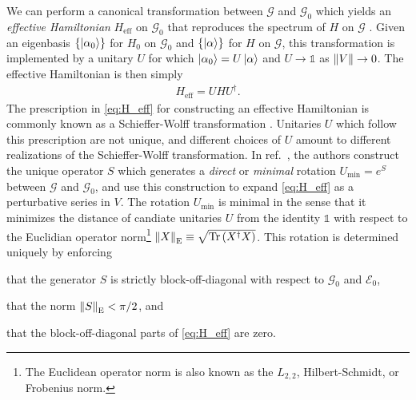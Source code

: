 \documentclass[preprint,showkeys,nofootinbib]{revtex4-1}
\renewcommand{\t}{\text} %
\newcommand{\p}[1]{\left(#1\right)} %
\renewcommand{\set}[1]{\left\{#1\right\}} %
\newcommand{\E}{\mathcal{E}}
\newcommand{\G}{\mathcal{G}}
\newcommand{\1}{\mathds{1}}
\begin{document}
We can perform a canonical transformation between $\G$ and $\G_0$
which yields an {\it effective Hamiltonian} $H_{\t{eff}}$ on $\G_0$
that reproduces the spectrum of $H$ on $\G$
\cite{bravyi2011schrieffer}.  Given an eigenbasis
$\set{\ket{\alpha_0}}$ for $H_0$ on $\G_0$ and $\set{\ket\alpha}$ for
$H$ on $\G$, this transformation is implemented by a unitary $U$ for
which $\ket{\alpha_0}=U\ket\alpha$ and $U\to\1$ as $\norm{V}\to0$.
The effective Hamiltonian is then simply
\begin{align}
  H_{\t{eff}} = U H U^\dag.
  \label{eq:H_eff}
\end{align}
The prescription in \eqref{eq:H_eff} for constructing an effective
Hamiltonian is commonly known as a Schieffer-Wolff transformation
\cite{schrieffer1966relation}.  Unitaries $U$ which follow this
prescription are not unique, and different choices of $U$ amount to
different realizations of the Schieffer-Wolff transformation.  In
ref.~\cite{bravyi2011schrieffer}, the authors construct the unique
operator $S$ which generates a {\it direct} or {\it minimal} rotation
$U_{\t{min}}=e^S$ between $\G$ and $\G_0$, and use this construction
to expand \eqref{eq:H_eff} as a perturbative series in $V$.  The
rotation $U_{\t{min}}$ is minimal in the sense that it minimizes the
distance of candiate unitaries $U$ from the identity $\1$ with respect
to the Euclidian operator norm\footnote{The Euclidean operator norm is
  also known as the $L_{2,2}$, Hilbert-Schmidt, or Frobenius norm.}
$\norm{X}_{\t{E}}\equiv\sqrt{\Tr\p{X^\dag X}}$.  This rotation is
determined uniquely by enforcing
\begin{enumerate*}
\item that the generator $S$ is strictly block-off-diagonal with
  respect to $\G_0$ and $\E_0$,
\item that the norm $\norm{S}_{\t{E}}<\pi/2$, and
\item that the block-off-diagonal parts of \eqref{eq:H_eff} are zero.
\end{enumerate*}
\end{document}
